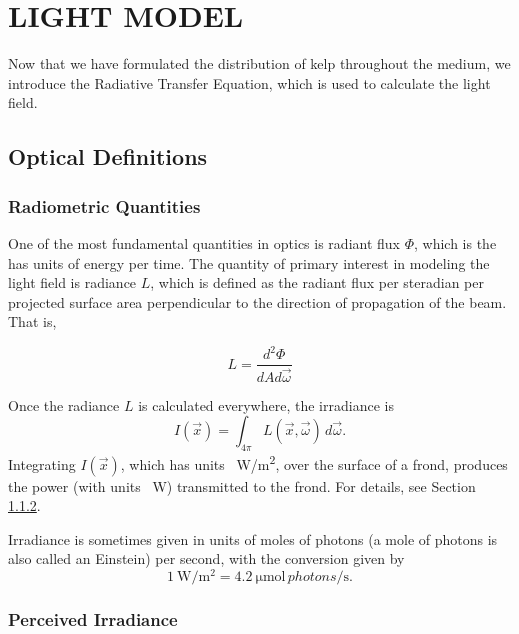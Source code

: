 \chapter{LIGHT MODEL}
\label{chap:light}

Now that we have formulated the distribution of kelp throughout the medium, we introduce the Radiative Transfer Equation, which is used to calculate the light field.

\section{Optical Definitions}

\subsection{Radiometric Quantities}

One of the most fundamental quantities in optics is radiant flux $\Phi$, which is the has units of energy per time.
The quantity of primary interest in modeling the light field is radiance $L$, which is defined as the radiant flux per steradian per projected surface area perpendicular to the direction of propagation of the beam.
That is,

\begin{equation*}
	L = \frac{d^2\Phi}{dA d\vec{\omega}}
\end{equation*}

Once the radiance $L$ is calculated everywhere, the irradiance is
\begin{equation*}
  I(\vec{x}) = \int_{4\pi}L(\vec{x},\vec{\omega})\, d\vec{\omega}.
\end{equation*}
Integrating $I(\vec{x})$, which has units \SI{}{\W/m^2}, over the surface of a frond, produces the power (with units \SI{}{\W}) transmitted to the frond.
For details, see Section \ref{sec:perceived_irrad}.

Irradiance is sometimes given in units of moles of photons (a mole of photons is also called an Einstein) per second, with the conversion \cite{mobley_light_1994} given by
\begin{equation}
  \SI{1}{\W\per\m^2} = \SI{4.2}{\micro\mole \,photons\per\second}.
  \label{eqn:watts_photons}
\end{equation}

\subsection{Perceived Irradiance}
\label{sec:perceived_irrad}

